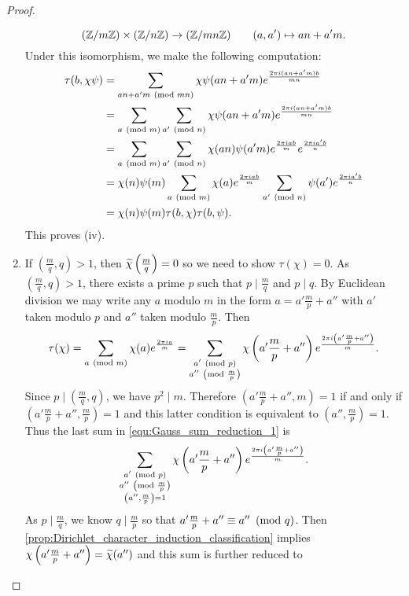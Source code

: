 \begin{proof}
\begin{enumerate}[label=(\roman*)]
          \[
            (\mathbb{Z}/m\mathbb{Z}) \times (\mathbb{Z}/n\mathbb{Z}) \to (\mathbb{Z}/mn\mathbb{Z}) \qquad (a,a') \mapsto an+a'm.
          \]
          Under this isomorphism, we make the following computation:
          \begin{align*}
            \tau(b,\chi\psi) &= \sum_{an+a'm \ \left(\text{mod }mn\right)}\chi\psi(an+a'm)e^{\frac{2\pi i(an+a'm)b}{mn}} \\
            &= \sum_{a\ \left(\text{mod }m\right)}\sum_{a'\ \left(\text{mod }n\right)}\chi\psi(an+a'm)e^{\frac{2\pi i(an+a'm)b}{mn}} \\
            &= \sum_{a\ \left(\text{mod }m\right)}\sum_{a'\ \left(\text{mod }n\right)}\chi(an)\psi(a'm)e^{\frac{2\pi iab}{m}}e^{\frac{2\pi ia'b}{n}} \\
            &= \chi(n)\psi(m)\sum_{a\ \left(\text{mod }m\right)}\chi(a)e^{\frac{2\pi iab}{m}}\sum_{a'\ \left(\text{mod }n\right)}\psi(a')e^{\frac{2\pi ia'b}{n}} \\
            &= \chi(n)\psi(m)\tau(b,\chi)\tau(b,\psi).
          \end{align*}
          This proves (iv).
          \item If $\left(\frac{m}{q},q\right) > 1$, then $\widetilde{\chi}\left(\frac{m}{q}\right) = 0$ so we need to show $\tau(\chi) = 0$. As $\left(\frac{m}{q},q\right) > 1$, there exists a prime $p$ such that $p \mid \frac{m}{q}$ and $p \mid q$. By Euclidean division we may write any $a$ modulo $m$ in the form $a = a'\frac{m}{p}+a''$ with $a'$ taken modulo $p$ and $a''$ taken modulo $\frac{m}{p}$. Then
          \begin{equation}\label{equ:Gauss_sum_reduction_1}
            \tau(\chi) = \sum_{a \ \left(\text{mod }m\right)}\chi(a)e^{\frac{2\pi ia}{m}} = \sum_{\substack{a' \ \left(\text{mod }p\right) \\ a'' \ \left(\text{mod }\frac{m}{p}\right)}}\chi\left(a'\frac{m}{p}+a''\right)e^{\frac{2\pi i\left(a'\frac{m}{p}+a''\right)}{m}}.
          \end{equation}
          Since $p \mid \left(\frac{m}{q},q\right)$, we have $p^{2} \mid m$. Therefore $\left(a'\frac{m}{p}+a'',m\right) = 1$ if and only if $\left(a'\frac{m}{p}+a'',\frac{m}{p}\right) = 1$ and this latter condition is equivalent to $\left(a'',\frac{m}{p}\right) = 1$. Thus the last sum in \cref{equ:Gauss_sum_reduction_1} is
          \[
            \sum_{\substack{a' \ \left(\text{mod }p\right) \\ a'' \ \left(\text{mod }\frac{m}{p}\right) \\ \left(a'',\frac{m}{p}\right) = 1}}\chi\left(a'\frac{m}{p}+a''\right)e^{\frac{2\pi i\left(a'\frac{m}{p}+a''\right)}{m}}.
          \]
          As $p \mid \frac{m}{q}$, we know $q \mid \frac{m}{p}$ so that $a'\frac{m}{p}+a'' \equiv a'' \ \left(\text{mod }q\right)$. Then \cref{prop:Dirichlet_character_induction_classification} implies $\chi\left(a'\frac{m}{p}+a''\right) = \widetilde{\chi}(a'')$ and this sum is further reduced to

\end{enumerate}
\end{proof}
